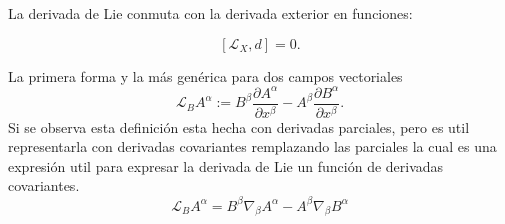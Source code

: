 \begin{axiom}\label{ax:Lie4}
    La derivada de Lie conmuta con la derivada exterior en funciones:

    $$
        \left[\mathcal{L}_X, d\right]=0.
    $$
\end{axiom}

\noindent La primera forma y la más genérica para dos campos vectoriales
\begin{equation}
    \mathscr{L}_B A^\alpha := B^\beta \frac{\partial A^\alpha}{\partial x^\beta}-A^\beta \frac{\partial B^\alpha}{\partial x^\beta}.
\end{equation}
Si se observa esta definición esta hecha con derivadas parciales, pero es util representarla con derivadas covariantes remplazando las parciales la cual es una expresión util para expresar la derivada de Lie un función de derivadas covariantes.
\begin{equation}
    \boxed{\mathscr{L}_B A^\alpha = B^\beta \nabla_\beta A^\alpha  - A^\beta \nabla_\beta B^\alpha }
\end{equation}

